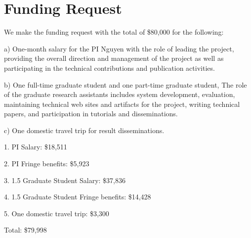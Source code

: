 \section{Funding Request}

We make the funding request with the total of \$80,000 for the following:

a) One-month salary for the PI Nguyen with the role of leading the
project, providing the overall direction and management of the project
as well as participating in the technical contributions and
publication activities.

b) One full-time graduate student and one part-time graduate student,
The role of the graduate research assistants includes system
development, evaluation, maintaining technical web sites and artifacts
for the project, writing technical papers, and participation in
tutorials and disseminations.

c) One domestic travel trip for result disseminations.

1. PI Salary: \$18,511

2. PI Fringe benefits: \$5,923

3. 1.5 Graduate Student Salary: \$37,836

4. 1.5 Graduate Student Fringe benefits: \$14,428

5. One domestic travel trip: \$3,300

Total: \$79,998


